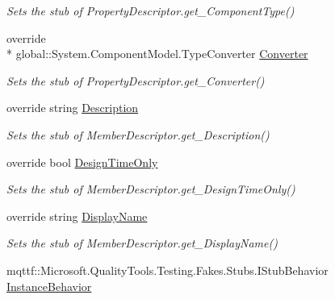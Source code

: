 \begin{DoxyCompactItemize}
\begin{DoxyCompactList}\small\item\em Sets the stub of Property\-Descriptor.\-get\-\_\-\-Component\-Type()\end{DoxyCompactList}\item 
override \\*
global\-::\-System.\-Component\-Model.\-Type\-Converter \hyperlink{class_system_1_1_component_model_1_1_fakes_1_1_stub_property_descriptor_acf5a7b949774363233f1ca931755752d}{Converter}
\begin{DoxyCompactList}\small\item\em Sets the stub of Property\-Descriptor.\-get\-\_\-\-Converter()\end{DoxyCompactList}\item 
override string \hyperlink{class_system_1_1_component_model_1_1_fakes_1_1_stub_property_descriptor_afd93ab47e1b8c72d40cffca5c7e35841}{Description}
\begin{DoxyCompactList}\small\item\em Sets the stub of Member\-Descriptor.\-get\-\_\-\-Description()\end{DoxyCompactList}\item 
override bool \hyperlink{class_system_1_1_component_model_1_1_fakes_1_1_stub_property_descriptor_ae65b8d1acd8a4079c79ba8fce812f677}{Design\-Time\-Only}
\begin{DoxyCompactList}\small\item\em Sets the stub of Member\-Descriptor.\-get\-\_\-\-Design\-Time\-Only()\end{DoxyCompactList}\item 
override string \hyperlink{class_system_1_1_component_model_1_1_fakes_1_1_stub_property_descriptor_ae68232f956fcbae25968d59e5df84b1c}{Display\-Name}
\begin{DoxyCompactList}\small\item\em Sets the stub of Member\-Descriptor.\-get\-\_\-\-Display\-Name()\end{DoxyCompactList}\item 
mqttf\-::\-Microsoft.\-Quality\-Tools.\-Testing.\-Fakes.\-Stubs.\-I\-Stub\-Behavior \hyperlink{class_system_1_1_component_model_1_1_fakes_1_1_stub_property_descriptor_a34846851a9418e6dbed4602f24e5fa3e}{Instance\-Behavior}

\end{DoxyCompactItemize}
